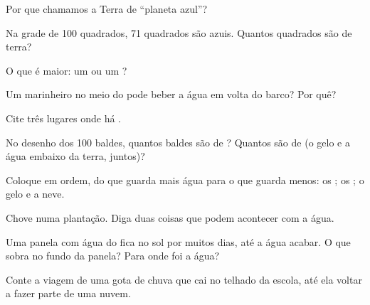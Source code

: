 \begin{exercise}[$\star$]\label{exo:g2:water-on-earth:2}
Por que chamamos a Terra de ``planeta azul''?
\end{exercise}

\begin{exercise}[$\star$]\label{exo:g2:water-on-earth:3}
Na grade de 100 quadrados, 71 quadrados são azuis. Quantos quadrados são
de terra?
\end{exercise}

\begin{exercise}[$\star$]\label{exo:g2:water-on-earth:4}
O que é maior: um  ou um ?
\end{exercise}

\begin{exercise}[$\star$]\label{exo:g2:water-on-earth:5}
Um marinheiro no meio do  pode beber a água em volta do barco? Por
quê?
\end{exercise}

\begin{exercise}[$\star$]\label{exo:g2:water-on-earth:6}
Cite três lugares onde há .
\end{exercise}

\begin{exercise}[$\star\star$]\label{exo:g2:water-on-earth:7}
No desenho dos 100 baldes, quantos baldes são de ? Quantos
são de  (o gelo e a água embaixo da terra, juntos)?
\end{exercise}

\begin{exercise}[$\star\star$]\label{exo:g2:water-on-earth:8}
Coloque em ordem, do que guarda mais água para o que guarda menos: os
; os ; o gelo e a neve.
\end{exercise}

\begin{exercise}[$\star\star$]\label{exo:g2:water-on-earth:9}
Chove numa plantação. Diga duas coisas que podem acontecer com a água.
\end{exercise}

\begin{exercise}[$\star\star$]\label{exo:g2:water-on-earth:10}
Uma panela com água do  fica no sol por muitos dias, até a água acabar.
O que sobra no fundo da panela? Para onde foi a água?
\end{exercise}

\begin{exercise}[$\star\star$]\label{exo:g2:water-on-earth:11}
Conte a viagem de uma gota de chuva que cai no telhado da escola, até ela
voltar a fazer parte de uma nuvem.
\end{exercise}
